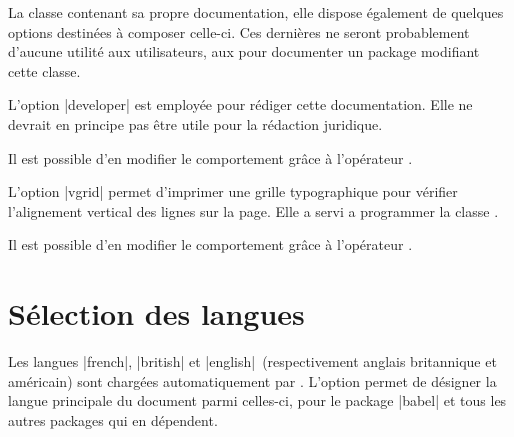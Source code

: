 La classe \frenchlaw contenant sa propre documentation, elle dispose également de quelques options destinées à composer celle-ci. Ces dernières ne seront probablement d'aucune utilité aux utilisateurs, aux pour documenter un package modifiant cette classe.

L'option |developer| est employée pour rédiger cette documentation. Elle ne devrait en principe pas être utile pour la rédaction juridique.

\begin{developer}
Il est possible d'en modifier le comportement grâce à l'opérateur .
\end{developer}

\begin{noprint}
\end{noprint}

L'option |vgrid| permet d'imprimer une grille typographique pour vérifier l'alignement vertical des lignes sur la page. Elle a servi a programmer la classe \frenchlaw.

\begin{developer}
Il est possible d'en modifier le comportement grâce à l'opérateur .
\end{developer}

\begin{noprint}
\end{noprint}



\section{Sélection des langues}

Les langues |french|, |british| et |english|~(respectivement anglais britannique et américain) sont chargées automatiquement par \frenchlaw. L'option permet de désigner la langue principale du document parmi celles-ci, pour le package |babel| et tous les autres packages qui en dépendent.

